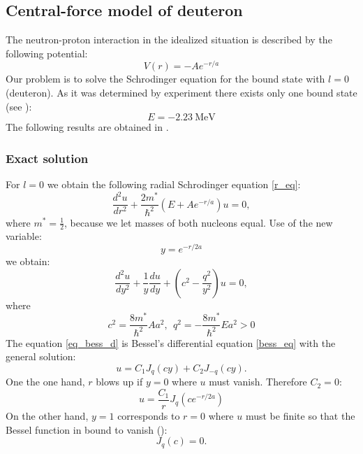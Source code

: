 \documentclass[a4paper, 12pt]{article}
\begin{document}
\subsection{Central-force model of deuteron}
The neutron-proton interaction in the idealized situation is described by the following potential:
$$V(r) = - A e^{-r/a}$$
Our problem is to solve the Schrodinger equation for the bound state with $l=0$ (deuteron). As it was determined by experiment there exists only one bound state (see \cite{griffiths2016introduction}):
\begin{equation}
    E = -2.23~\mathrm{MeV}
\end{equation}
The following results are obtained in \cite{griffiths2016introduction}.


\subsubsection{Exact solution}
For $l = 0$ we obtain the following radial Schrodinger equation \eqref{r_eq}:
\begin{equation}
    \frac{d^2 u}{d r^2} + \frac{2 m^*}{\hbar^2}(E+ A e^{-r/a})u = 0,
\end{equation}
where $m^* = \frac{1}{2}$, because we let masses of both nucleons equal. Use of the new variable:
\begin{equation}\label{abbr}
    y = e^{-r/2a}
\end{equation}
we obtain:
\begin{equation}\label{eq_bess_d}
    \frac{d^2 u}{d y^2} + \frac{1}{y}\frac{d u}{d y} + (c^2 - \frac{q^2}{y^2})u=0,
\end{equation}
where
\begin{equation}\label{abbr_2}
    c^2 = \frac{8 m^*}{\hbar^2}A a^2,~~q^2 = -\frac{8 m^*}{\hbar^2}E a^2 > 0
\end{equation}
The equation  \eqref{eq_bess_d} is Bessel's differential equation \eqref{bess_eq} with the general solution:
$$u = C_1 J_q(cy) + C_2 J_{-q} (cy).$$
One the one hand, $r$ blows up if $y = 0$ where $u$ must vanish. Therefore $C_2 = 0:$
\begin{equation}\label{ex_sol_deuteron}
    u = \frac{C_1}{r}J_q(c e^{-r/2a})
\end{equation}
On the other hand, $y = 1$ corresponds to $r = 0$ where $u$ must be finite so that the Bessel function in bound to vanish (\cite{griffiths2016introduction}):
$$J_q(c) = 0.$$
\end{document}

